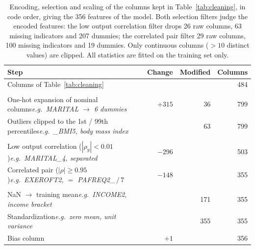 \begin{table}[t]
  \centering
  \caption{Encoding, selection and scaling of the columns kept in
    Table~\ref{tab:cleaning}, in code order, giving the 356 features of the model.
    Both selection filters judge the encoded features: the low output correlation
    filter drops 26 raw columns, 63 missing indicators and 207 dummies; the
    correlated pair filter 29 raw columns, 100 missing indicators and 19 dummies.
    Only continuous columns ($> 10$ distinct values) are clipped. All statistics
    are fitted on the training set only.}
  \label{tab:features}
  \footnotesize
  \setlength{\tabcolsep}{4pt}
  \setlength{\aboverulesep}{0pt}
  \setlength{\belowrulesep}{0pt}
  \renewcommand{\arraystretch}{1.3}
  \newcommand{\step}[2]{#1\newline\hspace*{1em}\textit{e.g.\ #2}}
  \newcommand{\phase}[1]{\multicolumn{1}{@{}l|}{\textbf{#1}} & & & \\}
  \begin{tabularx}{\linewidth}{@{}>{\raggedright\arraybackslash}X|r|r|r@{}}
    \toprule
    Step & Change & Modified & Columns \\
    \midrule
    Columns of Table~\ref{tab:cleaning} & & & 484 \\
    \phase{Encoding}
    \step{One-hot expansion of nominal columns}{MARITAL $\rightarrow$ 6 dummies} & $+315$ & 36 & 799 \\
    \step{Outliers clipped to the 1st / 99th percentiles}{\_BMI5, body mass index} & & 63 & 799 \\
    \phase{Selection}
    \step{Low output correlation ($|\rho_y| < 0.01$)}{MARITAL\_4, separated} & $-296$ & & 503 \\
    \step{Correlated pair ($|\rho| \geq 0.95$)}{EXEROFT2, $= $ PAFREQ2\_$\,/\,7$} & $-148$ & & 355 \\
    \phase{Scaling}
    \step{NaN $\rightarrow$ training mean}{INCOME2, income bracket} & & 171 & 355 \\
    \step{Standardization}{zero mean, unit variance} & & 355 & 355 \\
    Bias column & $+1$ & & 356 \\
    \bottomrule
  \end{tabularx}
\end{table}
